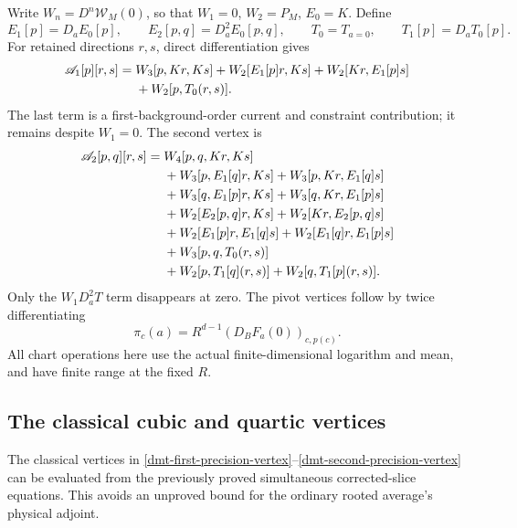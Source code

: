 \documentclass[11pt]{article}
\theoremstyle{remark}
\begin{document}
Write \(W_n=D^n\mathcal W_M(0)\), so that
\(W_1=0\), \(W_2=P_M\), \(E_0=K\). Define
\[
 E_1[p]=D_aE_0[p],\qquad E_2[p,q]=D_a^2E_0[p,q],
 \qquad T_0=T_{a=0},\qquad T_1[p]=D_aT_0[p].
\]
For retained directions \(r,s\), direct differentiation gives
\begin{align}
 \mathscr A_1[p][r,s]
 ={}&W_3[p,Kr,Ks]
       +W_2[E_1[p]r,Ks]+W_2[Kr,E_1[p]s]\notag\\
 &+W_2[p,T_0(r,s)].
 \label{dmt-first-precision-vertex}
\end{align}
The last term is a first-background-order current and
constraint contribution; it remains despite \(W_1=0\).
The second vertex is
\begin{align}
 \mathscr A_2[p,q][r,s]
 ={}&W_4[p,q,Kr,Ks]\notag\\
 &+W_3[p,E_1[q]r,Ks]+W_3[p,Kr,E_1[q]s]\notag\\
 &+W_3[q,E_1[p]r,Ks]+W_3[q,Kr,E_1[p]s]\notag\\
 &+W_2[E_2[p,q]r,Ks]+W_2[Kr,E_2[p,q]s]\notag\\
 &+W_2[E_1[p]r,E_1[q]s]
       +W_2[E_1[q]r,E_1[p]s]\notag\\
 &+W_3[p,q,T_0(r,s)]\notag\\
 &+W_2[p,T_1[q](r,s)]
       +W_2[q,T_1[p](r,s)].
 \label{dmt-second-precision-vertex}
\end{align}
Only the \(W_1D_a^2T\) term disappears at zero.
The pivot vertices follow by twice differentiating
\begin{equation}
             \pi_c(a)=R^{d-1}(D_BF_a(0))_{c,p(c)}.
 \label{dmt-pivot-vertex-definition}
\end{equation}
All chart operations here use the actual finite-dimensional
logarithm and mean, and have finite range at the fixed \(R\).

\subsection{The classical cubic and quartic vertices}
\label{dmt-classical-vertices-section}

The classical vertices in
\eqref{dmt-first-precision-vertex}--\eqref{dmt-second-precision-vertex}
can be evaluated from the previously proved simultaneous
corrected-slice equations. This avoids an unproved bound for
the ordinary rooted average's physical adjoint.
\end{document}
